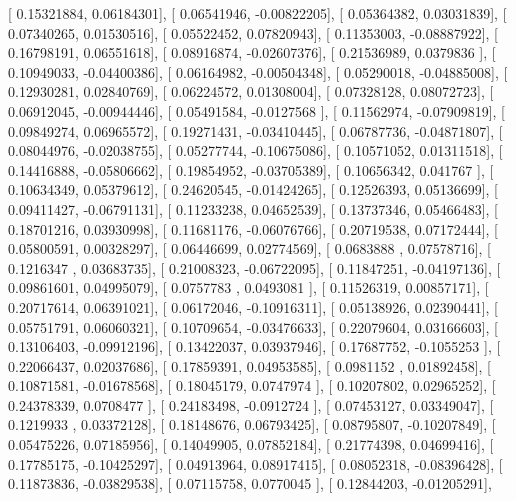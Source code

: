 \documentclass{article}
\begin{document}
       [ 0.15321884,  0.06184301],
       [ 0.06541946, -0.00822205],
       [ 0.05364382,  0.03031839],
       [ 0.07340265,  0.01530516],
       [ 0.05522452,  0.07820943],
       [ 0.11353003, -0.08887922],
       [ 0.16798191,  0.06551618],
       [ 0.08916874, -0.02607376],
       [ 0.21536989,  0.0379836 ],
       [ 0.10949033, -0.04400386],
       [ 0.06164982, -0.00504348],
       [ 0.05290018, -0.04885008],
       [ 0.12930281,  0.02840769],
       [ 0.06224572,  0.01308004],
       [ 0.07328128,  0.08072723],
       [ 0.06912045, -0.00944446],
       [ 0.05491584, -0.0127568 ],
       [ 0.11562974, -0.07909819],
       [ 0.09849274,  0.06965572],
       [ 0.19271431, -0.03410445],
       [ 0.06787736, -0.04871807],
       [ 0.08044976, -0.02038755],
       [ 0.05277744, -0.10675086],
       [ 0.10571052,  0.01311518],
       [ 0.14416888, -0.05806662],
       [ 0.19854952, -0.03705389],
       [ 0.10656342,  0.041767  ],
       [ 0.10634349,  0.05379612],
       [ 0.24620545, -0.01424265],
       [ 0.12526393,  0.05136699],
       [ 0.09411427, -0.06791131],
       [ 0.11233238,  0.04652539],
       [ 0.13737346,  0.05466483],
       [ 0.18701216,  0.03930998],
       [ 0.11681176, -0.06076766],
       [ 0.20719538,  0.07172444],
       [ 0.05800591,  0.00328297],
       [ 0.06446699,  0.02774569],
       [ 0.0683888 ,  0.07578716],
       [ 0.1216347 ,  0.03683735],
       [ 0.21008323, -0.06722095],
       [ 0.11847251, -0.04197136],
       [ 0.09861601,  0.04995079],
       [ 0.0757783 ,  0.0493081 ],
       [ 0.11526319,  0.00857171],
       [ 0.20717614,  0.06391021],
       [ 0.06172046, -0.10916311],
       [ 0.05138926,  0.02390441],
       [ 0.05751791,  0.06060321],
       [ 0.10709654, -0.03476633],
       [ 0.22079604,  0.03166603],
       [ 0.13106403, -0.09912196],
       [ 0.13422037,  0.03937946],
       [ 0.17687752, -0.1055253 ],
       [ 0.22066437,  0.02037686],
       [ 0.17859391,  0.04953585],
       [ 0.0981152 ,  0.01892458],
       [ 0.10871581, -0.01678568],
       [ 0.18045179,  0.0747974 ],
       [ 0.10207802,  0.02965252],
       [ 0.24378339,  0.0708477 ],
       [ 0.24183498, -0.0912724 ],
       [ 0.07453127,  0.03349047],
       [ 0.1219933 ,  0.03372128],
       [ 0.18148676,  0.06793425],
       [ 0.08795807, -0.10207849],
       [ 0.05475226,  0.07185956],
       [ 0.14049905,  0.07852184],
       [ 0.21774398,  0.04699416],
       [ 0.17785175, -0.10425297],
       [ 0.04913964,  0.08917415],
       [ 0.08052318, -0.08396428],
       [ 0.11873836, -0.03829538],
       [ 0.07115758,  0.0770045 ],
       [ 0.12844203, -0.01205291],
\end{document}

